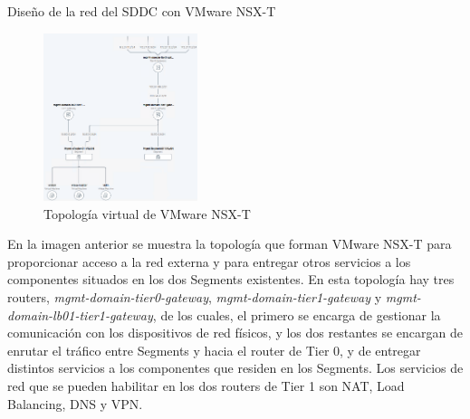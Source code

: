 \begin{subsubsection}{Diseño de la red del SDDC con VMware NSX-T}
    \begin{figure}[h]
        \centering
        \includegraphics[width=0.4\textwidth]{imaxes/pruebaconcepto/topologiaTwoTierRouting-Final.png}
        \caption{Topología virtual de VMware NSX-T}
        \label{fig:Uplink-Design-Edge-NSXT} 
    \end{figure}
    \FloatBarrier
    En la imagen anterior se muestra la topología que forman VMware NSX-T para proporcionar acceso a la red externa y para entregar otros servicios a los componentes situados en los dos Segments existentes. En esta topología hay tres routers, \textit{mgmt-domain-tier0-gateway}, \textit{mgmt-domain-tier1-gateway} y \textit{mgmt-domain-lb01-tier1-gateway}, de los cuales, el primero se encarga de gestionar la comunicación con los dispositivos de red físicos, y los dos restantes se encargan de enrutar el tráfico entre Segments y hacia el router de Tier 0, y de entregar distintos servicios a los componentes que residen en los Segments. Los servicios de red que se pueden habilitar en los dos routers de Tier 1 son NAT, Load Balancing, DNS y VPN.
\end{subsubsection}